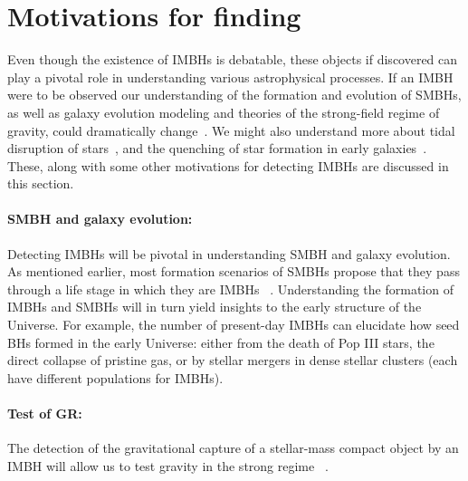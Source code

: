 


\section{Motivations for finding}

Even though the existence of IMBHs is debatable, these objects if
discovered can play a pivotal role in understanding various
astrophysical processes. If an IMBH were to be observed our
understanding of the formation and evolution of SMBHs, as well as galaxy
evolution modeling and theories of the strong-field regime of gravity, could
dramatically change~\cite{mezcua2017observational}. We might also understand
more about tidal disruption of stars~\cite{IMBHcauseTidalDisruption}, and
the quenching of star formation in early galaxies~\cite{kim2011galaxy}.
These, along with some other motivations for detecting IMBHs are
discussed in this section.


\paragraph{SMBH and galaxy evolution:} 
Detecting IMBHs will be pivotal in understanding SMBH and galaxy
evolution. As mentioned earlier, most formation scenarios of SMBHs
propose that they pass through a life stage in which they are IMBHs
~\cite{mezcua2017observational}. Understanding the formation of IMBHs and SMBHs will in turn yield
insights to the early structure of the Universe. For example, the
number of present-day IMBHs can elucidate how seed BHs formed in the
early Universe: either from the death of Pop III stars, the direct
collapse of pristine gas, or by stellar mergers in dense stellar
clusters (each have different populations for IMBHs).

\paragraph{Test of GR:} The detection of the gravitational capture of a stellar-mass compact object by an IMBH will allow us to test gravity in the strong regime ~\cite{GWimbhProspects}.

